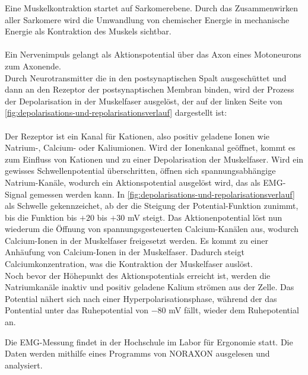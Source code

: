 Eine Muskelkontraktion startet auf Sarkomerebene.
Durch das Zusammenwirken aller Sarkomere wird die Umwandlung von chemischer Energie in mechanische Energie als Kontraktion des Muskels sichtbar.
\\
\\
Ein  Nervenimpuls gelangt als Aktionspotential über das Axon eines Motoneurons zum Axonende. \\
Durch Neurotransmitter die in den postsynaptischen Spalt ausgeschüttet und dann an den Rezeptor der postsynaptischen Membran binden, wird der Prozess der Depolarisation in der Muskelfaser ausgelöst, der auf der linken Seite von  \autoref{fig:depolarisations-und-repolarisationsverlauf} dargestellt ist:\\
\\
Der Rezeptor ist ein Kanal für Kationen, also positiv geladene Ionen wie Natrium-, Calcium- oder Kaliumionen. Wird der Ionenkanal geöffnet, kommt es zum Einfluss von Kationen und zu einer  Depolarisation der Muskelfaser. Wird ein gewisses Schwellenpotential überschritten, öffnen sich spannungsabhängige Natrium-Kanäle, wodurch ein Aktionspotential ausgelöst wird, das als EMG-Signal gemessen werden kann.
In \autoref{fig:depolarisations-und-repolarisationsverlauf} als Schwelle gekennzeichet, ab der die Steigung der Potential-Funktion zunimmt, bis die Funktion bis $+20$ bis $+30$ mV steigt.
Das Aktionenpotential löst nun wiederum die Öffnung von spannungsgesteuerten Calcium-Kanälen aus, wodurch Calcium-Ionen in der Muskelfaser freigesetzt werden. Es kommt zu einer Anhäufung von Calcium-Ionen in der Muskelfaser. Dadurch steigt Calciumkonzentration, was die Kontraktion der Muskelfaser auslöst. \\
Noch bevor der Höhepunkt des Aktionspotentials erreicht ist, werden die Natriumkanäle inaktiv und positiv geladene Kalium strömen aus der Zelle. Das Potential nähert sich nach einer Hyperpolarisationsphase, während der das Pontential unter das Ruhepotential von $-80$ mV fällt, wieder dem Ruhepotential an.

Die EMG-Messung findet in der Hochschule im Labor für Ergonomie statt.
Die Daten werden mithilfe eines Programms von NORAXON ausgelesen und analysiert.



